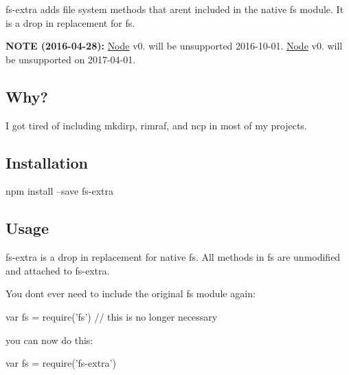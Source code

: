 {\ttfamily fs-\/extra} adds file system methods that aren\textquotesingle{}t included in the native {\ttfamily fs} module. It is a drop in replacement for {\ttfamily fs}.

\href{https://www.npmjs.org/package/fs-extra}{\tt } \href{http://travis-ci.org/jprichardson/node-fs-extra}{\tt } \href{https://ci.appveyor.com/project/jprichardson/node-fs-extra/branch/master}{\tt } \href{https://www.npmjs.org/package/fs-extra}{\tt } \href{https://coveralls.io/r/jprichardson/node-fs-extra}{\tt }

\href{https://github.com/feross/standard}{\tt }

{\bfseries N\+O\+TE (2016-\/04-\/28)\+:} \mbox{\hyperlink{classNode}{Node}} v0. will be unsupported 2016-\/10-\/01. \mbox{\hyperlink{classNode}{Node}} v0. will be unsupported on 2017-\/04-\/01.

\subsection*{Why? }

I got tired of including {\ttfamily mkdirp}, {\ttfamily rimraf}, and {\ttfamily ncp} in most of my projects.

\subsection*{Installation }

\begin{DoxyVerb}npm install --save fs-extra
\end{DoxyVerb}


\subsection*{Usage }

{\ttfamily fs-\/extra} is a drop in replacement for native {\ttfamily fs}. All methods in {\ttfamily fs} are unmodified and attached to {\ttfamily fs-\/extra}.

You don\textquotesingle{}t ever need to include the original {\ttfamily fs} module again\+:


\begin{DoxyCode}
var fs = require('fs') // this is no longer necessary
\end{DoxyCode}


you can now do this\+:


\begin{DoxyCode}
var fs = require('fs-extra')
\end{DoxyCode}


